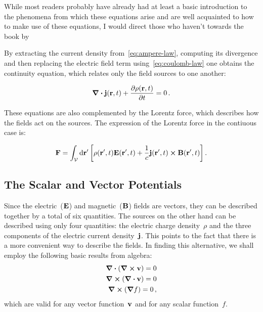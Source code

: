 \documentclass[12pt, class=report, crop=false]{standalone}
\begin{document}
\par
While most readers probably have already had at least a basic introduction to the phenomena from which these equations arise and are well acquainted to how to make use of these equations, I would direct those who haven't towards the book by~\cite{fleischStudentGuideMaxwell2008}%

\par
By extracting the current density from~\cref{eq:ampere-law}, computing its divergence and then replacing the electric field term using~\cref{eq:coulomb-law} one obtains the continuity equation, which relates only the field sources to one another:

\begin{equation}
  \label{eq:continuity-equation}
  \div{\vb{j}(\vb{r}, t)} + \pdv{\rho(\vb{r}, t)}{t} = 0 \,.
\end{equation}

\par
These equations are also complemented by the Lorentz force, which describes how the fields act on the sources. The expression of the Lorentz force in the contiuous case is:

\[
  \vb{F} = \int_\mathcal{V} \dd{\vb{r}'} \left[ \rho(\vb{r}', t) \vb{E}(\vb{r}', t) +
           \frac{1}{c} \vb{j}(\vb{r}', t) \cross \vb{B}(\vb{r}', t)\right] .
\]

\subsection{The Scalar and Vector Potentials}
\label{section:scalar-vector-potential}
Since the electric~(\(\vb{E}\)) and magnetic~(\(\vb{B}\)) fields are vectors, they can be described together by a total of six quantities. The sources on the other hand can be described using only four quantities: the electric charge density~\(\rho\) and the three components of the electric current density~\(\vb{j}\). This points to the fact that there is a more convenient way to describe the fields. In finding this alternative, we shall employ the following basic results from algebra:
\begin{subequations}
  \label{id:algebra}
  \begin{align}
    \div{(\curl{\vb{v}})}=0
    \label{id:div-rot} \\
    \curl{(\div{\vb{v}})}=0
    \label{id:rot-div} \\
    \curl{(\grad{f})}=0
    \label{id:rot-grad} \,,
  \end{align}
\end{subequations}
which are valid for any vector function~\(\vb{v}\) and for any scalar function~\(f\).
\end{document}
